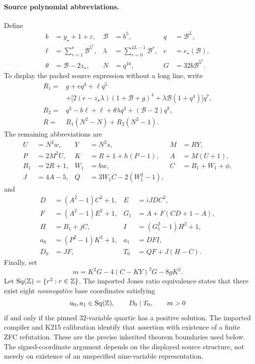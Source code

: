 \paragraph{Source polynomial abbreviations.}
Define
\begin{align*}
 b&=y_\star+1+\varepsilon,
 &\mathcal B&=b^5,
 &q&=\mathcal B^L,\\
 \ell&=\sum_{r=1}^{\nu}\mathcal B^{5^r},
 &\lambda&=\sum_{r=0}^{4L-1}\mathcal B^r,
 &e&=e_\star(\mathcal B),\\
 \theta&=\mathcal B-2z_\star,
 &N&=q^{16},
 &G&=32b\mathcal B^{5^\nu}.
\end{align*}
To display the packed source expression without a long line, write
\begin{align*}
 R_1={}&g+eq^3+\ell q^5\\
 &+\bigl[2(e-z_\star\lambda)(1+\mathcal B+g)^4
       +\lambda\mathcal B(1+q^4)\bigr]q^7,\\
 R_2={}&q^3-b\ell+\ell+\theta\lambda q^3+(\mathcal B-2)q^8,\\
 R={}&R_1(N^2-N)+R_2(N^2-1).
\end{align*}
The remaining abbreviations are
\begin{align*}
 U&=N^2w,&Y&=N^2s,&M&=RY,\\
 P&=2M^2U,&K&=R+1+h(P-1),&A&=M(U+1),\\
 B_1&=2R+1,&W_1&=bw,&C&=B_1+W_1+\phi,\\
 J&=4A-5,&Q&=3W_1C-2(W_1^2-1),
\end{align*}
and
\begin{align*}
 D&=(A^2-1)C^2+1,&E&=iJDC^2,\\
 F&=(A^2-1)E^2+1,&G_1&=A+F(CD+1-A),\\
 H&=B_1+jC,&I&=(G_1^2-1)H^2+1,\\
 a_0&=(P^2-1)K^2+1,&a_1&=DFI,\\
 D_0&=JF,&T_0&=QF+J(H-C).
\end{align*}
Finally, set
\[
 m=K^2G-4(C-KY)^2G-8gK^2.
\]
Let $\operatorname{Sq}(\mathbb Z)=\{r^2:r\in\mathbb Z\}$.
The imported Jones ratio equivalence states that there exist eight
\emph{nonnegative} base coordinates satisfying
\begin{equation}
 a_0,a_1\in\operatorname{Sq}(\mathbb Z),\qquad
 D_0\mid T_0,\qquad m>0
 \label{i17:JR}
\end{equation}
if and only if the pinned $32$-variable quartic has a positive solution.
The imported compiler and K215 calibration identify that assertion with
existence of a finite ZFC refutation. These are the precise inherited
theorem boundaries used below. The signed-coordinate argument depends
on the displayed source structure, not merely on existence of an
unspecified nine-variable representation.

